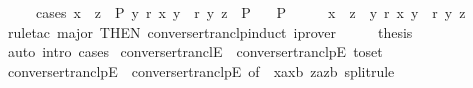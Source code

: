 \begin{isabellebody}
\ \ \ \ \ cases{\isacharcolon}{\kern0pt}\ {\isachardoublequoteopen}x\ {\isacharequal}{\kern0pt}\ z\ {\isasymLongrightarrow}\ P{\isachardoublequoteclose}\ {\isachardoublequoteopen}{\isasymAnd}y{\isachardot}{\kern0pt}\ r\ x\ y\ {\isasymLongrightarrow}\ r\isactrlsup {\isacharasterisk}{\kern0pt}\isactrlsup {\isacharasterisk}{\kern0pt}\ y\ z\ {\isasymLongrightarrow}\ P{\isachardoublequoteclose}\isanewline
\ \ \ P\isanewline
%
\isadelimproof
%
\endisadelimproof
%
\isatagproof
{}\isamarkupfalse%
\ {\isacharminus}{\kern0pt}\isanewline
\ \ \isamarkupfalse%
\ {\isachardoublequoteopen}x\ {\isacharequal}{\kern0pt}\ z\ {\isasymor}\ {\isacharparenleft}{\kern0pt}{\isasymexists}y{\isachardot}{\kern0pt}\ r\ x\ y\ {\isasymand}\ r\isactrlsup {\isacharasterisk}{\kern0pt}\isactrlsup {\isacharasterisk}{\kern0pt}\ y\ z{\isacharparenright}{\kern0pt}{\isachardoublequoteclose}\isanewline
\ \ \ \ \isamarkupfalse%
\ {\isacharparenleft}{\kern0pt}rule{\isacharunderscore}{\kern0pt}tac\ major\ {\isacharbrackleft}{\kern0pt}THEN\ converse{\isacharunderscore}{\kern0pt}rtranclp{\isacharunderscore}{\kern0pt}induct{\isacharbrackright}{\kern0pt}{\isacharparenright}{\kern0pt}\ iprover{\isacharplus}{\kern0pt}\isanewline
\ \ \isamarkupfalse%
\ \isamarkupfalse%
\ {\isacharquery}{\kern0pt}thesis\isanewline
\ \ \ \ \isamarkupfalse%
\ {\isacharparenleft}{\kern0pt}auto\ intro{\isacharcolon}{\kern0pt}\ cases{\isacharparenright}{\kern0pt}\isanewline
{}\isamarkupfalse%
%
\endisatagproof
{\isafoldproof}%
%
\isadelimproof
\isanewline
%
\endisadelimproof
\isanewline
{}\isamarkupfalse%
\ converse{\isacharunderscore}{\kern0pt}rtranclE\ {\isacharequal}{\kern0pt}\ converse{\isacharunderscore}{\kern0pt}rtranclpE\ {\isacharbrackleft}{\kern0pt}to{\isacharunderscore}{\kern0pt}set{\isacharbrackright}{\kern0pt}\isanewline
\isanewline
{}\isamarkupfalse%
\ converse{\isacharunderscore}{\kern0pt}rtranclpE{}\ {\isacharequal}{\kern0pt}\ converse{\isacharunderscore}{\kern0pt}rtranclpE\ {\isacharbrackleft}{\kern0pt}of\ {\isacharunderscore}{\kern0pt}\ {\isachardoublequoteopen}{\isacharparenleft}{\kern0pt}xa{\isacharcomma}{\kern0pt}xb{\isacharparenright}{\kern0pt}{\isachardoublequoteclose}\ {\isachardoublequoteopen}{\isacharparenleft}{\kern0pt}za{\isacharcomma}{\kern0pt}zb{\isacharparenright}{\kern0pt}{\isachardoublequoteclose}{\isacharcomma}{\kern0pt}\ split{\isacharunderscore}{\kern0pt}rule{\isacharbrackright}{\kern0pt}\isanewline
\isanewline

\end{isabellebody}
